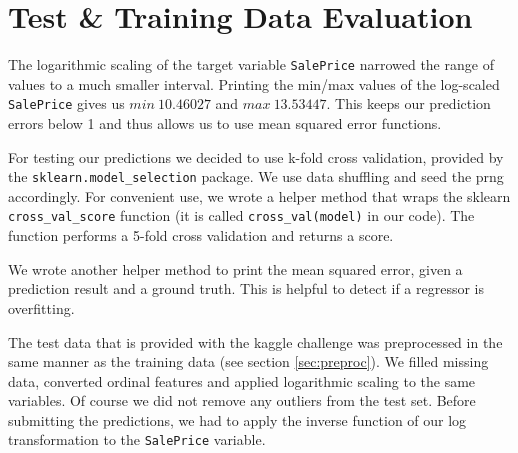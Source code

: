 \section{Test \& Training Data Evaluation}

The logarithmic scaling of the target variable \texttt{SalePrice} narrowed the range of values to a much smaller interval. Printing the min/max values of the log-scaled \texttt{SalePrice} gives us $min~10.46027$ and $max~13.53447$. This keeps our prediction errors below 1 and thus allows us to use mean squared error functions.

For testing our predictions we decided to use k-fold cross validation, provided by the \texttt{sklearn.model\_selection} package. We use data shuffling and seed the prng accordingly. For convenient use, we wrote a helper method that wraps the sklearn \texttt{cross\_val\_score} function (it is called \texttt{cross\_val(model)} in our code). The function performs a 5-fold cross validation and returns a score.

We wrote another helper method to print the mean squared error, given a prediction result and a ground truth. This is helpful to detect if a regressor is overfitting.

The test data that is provided with the kaggle challenge was preprocessed in the same manner as the training data (see section \ref{sec:preproc}). We filled missing data, converted ordinal features and applied logarithmic scaling to the same variables. Of course we did not remove any outliers from the test set. Before submitting the predictions, we had to apply the inverse function of our log transformation to the \texttt{SalePrice} variable.